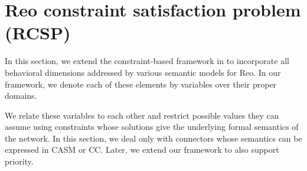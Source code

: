 

\section{Reo constraint satisfaction problem (RCSP)}
\label{sec:ecsp}
In this section, we extend the constraint-based framework in \cite{JoseThesis} to incorporate all behavioral dimensions addressed by various semantic models for Reo. In our framework, we denote each of these elements by variables over their proper domains. 

We relate these variables to each other and restrict possible values they can assume using constraints whose solutions give the underlying formal semantics of the network. In this section, we deal only with connectors whose semantics can be expressed in CASM or CC. Later, we extend our framework to also support priority.

